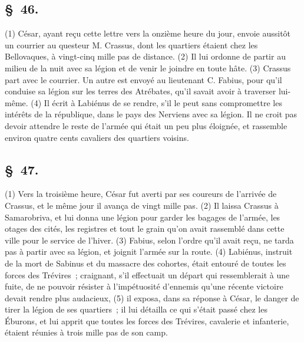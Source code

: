 \documentclass[french,twoside]{book} %
\begin{document}
\subsection[{§ 46.}]{ \textsc{§ 46.} }
\noindent (1) César, ayant reçu cette lettre vers la onzième heure du jour, envoie aussitôt un courrier au questeur M. Crassus, dont les quartiers étaient chez les Bellovaques, à vingt-cinq mille pas de distance. (2) Il lui ordonne de partir au milieu de la nuit avec sa légion et de venir le joindre en toute hâte. (3) Crassus part avec le courrier. Un autre est envoyé au lieutenant C. Fabius, pour qu’il conduise sa légion sur les terres des Atrébates, qu’il savait avoir à traverser lui-même. (4) Il écrit à Labiénus de se rendre, s’il le peut sans compromettre les intérêts de la république, dans le pays des Nerviens avec sa légion. Il ne croit pas devoir attendre le reste de l’armée qui était un peu plus éloignée, et rassemble environ quatre cents cavaliers des quartiers voisins.
\subsection[{§ 47.}]{ \textsc{§ 47.} }
\noindent (1) Vers la troisième heure, César fut averti par ses coureurs de l’arrivée de Crassus, et le même jour il avança de vingt mille pas. (2) Il laissa Crassus à Samarobriva, et lui donna une légion pour garder les bagages de l’armée, les otages des cités, les registres et tout le grain qu’on avait rassemblé dans cette ville pour le service de l’hiver. (3) Fabius, selon l’ordre qu’il avait reçu, ne tarda pas à partir avec sa légion, et joignit l’armée sur la route. (4) Labiénus, instruit de la mort de Sabinus et du massacre des cohortes, était entouré de toutes les forces des Trévires ; craignant, s’il effectuait un départ qui ressemblerait à une fuite, de ne pouvoir résister à l’impétuosité d’ennemis qu’une récente victoire devait rendre plus audacieux, (5) il exposa, dans sa réponse à César, le danger de tirer la légion de ses quartiers ; il lui détailla ce qui s’était passé chez les Éburons, et lui apprit que toutes les forces des Trévires, cavalerie et infanterie, étaient réunies à trois mille pas de son camp.
\end{document}
